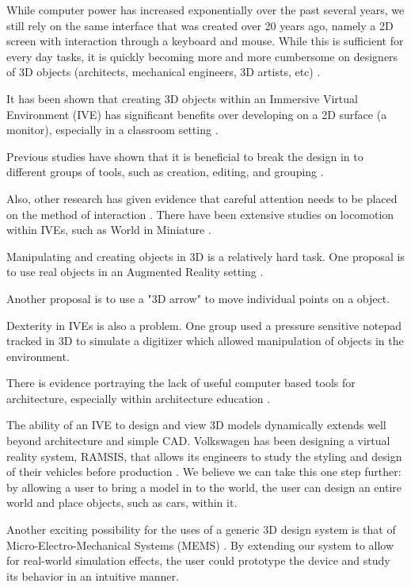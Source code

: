While computer power has increased exponentially over the past several years, we still rely on the same interface that was created over 20 years ago, namely a 2D screen with interaction through a keyboard and mouse.
While this is sufficient for every day tasks, it is quickly becoming more and more cumbersome on designers of 3D objects (architects, mechanical engineers, 3D artists, etc) \cite{Dekker199242}.

It has been shown that creating 3D objects within an Immersive Virtual Environment (IVE) has significant benefits over developing on a 2D surface (a monitor)\cite{Kaufmann:Usability}, especially in a classroom setting \cite{Kaufmann:LearningGeometry}.

Previous studies have shown that it is beneficial to break the design in to different groups of tools, such as creation, editing, and grouping
\cite{Butterworth:1992:3DM}.

Also, other research has given evidence that careful attention needs to be placed on the method of interaction \cite{Bowman98interactiontechniques}.
There have been extensive studies on locomotion within IVEs, such as World in Miniature \cite{Pausch:WorldInMiniature}.

Manipulating and creating objects in 3D is a relatively hard task\cite{Mine:MovingObjects}.
One proposal is to use real objects in an Augmented Reality setting
\cite{Jota:2011:CVM:1979742.1979915}.

Another proposal is to use a "3D arrow" to move individual points on a object\cite{5759472}.

Dexterity in IVEs is also a problem.
One group used a pressure sensitive notepad tracked in 3D to simulate a digitizer which allowed manipulation of
objects in the environment\cite{658467}.

There is evidence portraying the lack of useful computer based tools for architecture, especially within architecture education \cite{Dobson:Architecture}.

The ability of an IVE to design and view 3D models dynamically extends well beyond architecture and simple CAD.
Volkswagen has been designing a virtual reality system, RAMSIS, that allows its engineers to study the styling and design of their vehicles before production \cite{Purschke:Cars}.
We believe we can take this one step further: by allowing a user to bring a model in to the world, the user can design an entire world and place objects, such as cars, within it.

Another exciting possibility for the uses of a generic 3D design system is that of Micro-Electro-Mechanical Systems (MEMS) \cite{Zhao:MEMS}.
By extending our system to allow for real-world simulation effects, the user could prototype the device and study its behavior in an intuitive manner.